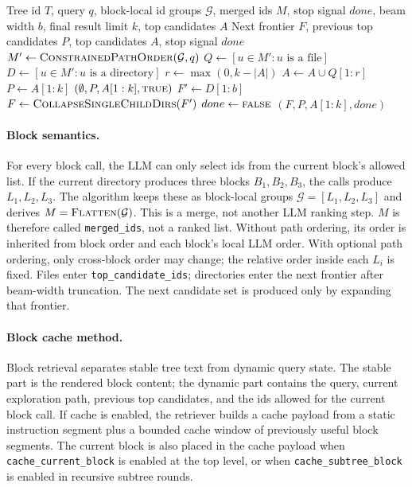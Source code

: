 \documentclass{article}
\begin{document}
\begin{algorithm}[H]
\caption{UpdateState}
\begin{algorithmic}[1]
\Require Tree id $T$, query $q$, block-local id groups $\mathcal{G}$, merged ids $M$, stop signal $done$, beam width $b$, final result limit $k$, top candidates $A$
\Ensure Next frontier $F$, previous top candidates $P$, top candidates $A$, stop signal $done$
\State $M' \gets \Call{ConstrainedPathOrder}{\mathcal{G},q}$
\State $Q \gets [u \in M': u \text{ is a file}]$
\State $D \gets [u \in M': u \text{ is a directory}]$
\State $r \gets \max(0, k-|A|)$
\State $A \gets A \cup Q[1:r]$
\State $P \gets A[1:k]$
  \State \Return $(\emptyset,P,A[1:k],\textsc{true})$
\EndIf
\State $F' \gets D[1:b]$
\State $F \gets \Call{CollapseSingleChildDirs}{F'}$
  \State $done \gets \textsc{false}$
\EndIf
\State \Return $(F,P,A[1:k],done)$
\end{algorithmic}
\end{algorithm}

\paragraph{Block semantics.}
For every block call, the LLM can only select ids from the current block's
allowed list. If the current directory produces three blocks
$B_1,B_2,B_3$, the calls produce $L_1,L_2,L_3$. The algorithm keeps these as
block-local groups $\mathcal{G}=[L_1,L_2,L_3]$ and derives
$M=\Call{Flatten}{\mathcal{G}}$. This is a merge, not another LLM ranking step.
$M$ is therefore called \texttt{merged\_ids}, not a ranked list. Without path
ordering, its order is inherited from block order and each block's local LLM
order. With optional path ordering, only cross-block order may change; the
relative order inside each $L_i$ is fixed. Files enter
\texttt{top\_candidate\_ids}; directories enter the next frontier after
beam-width truncation. The next candidate set is produced only by expanding that
frontier.

\paragraph{Block cache method.}
Block retrieval separates stable tree text from dynamic query state. The stable
part is the rendered block content; the dynamic part contains the query, current
exploration path, previous top candidates, and the ids allowed for the current
block call. If cache is enabled, the retriever builds a cache payload from a
static instruction segment plus a bounded cache window of previously useful
block segments. The current block is also placed in the cache payload when
\texttt{cache\_current\_block} is enabled at the top level, or when
\texttt{cache\_subtree\_block} is enabled in recursive subtree rounds.
\end{document}
